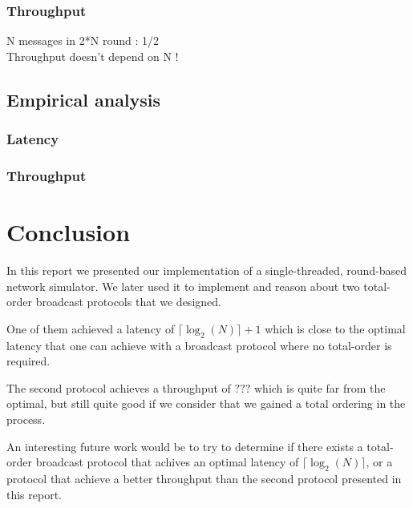 \documentclass[a4paper]{article}
\begin{document}
\subsubsection*{Throughput}
N messages in 2*N round : 1/2 \\
Throughput doesn't depend on N !
\subsection{Empirical analysis}

\subsubsection*{Latency}

\subsubsection*{Throughput}

\section*{Conclusion}
In this report we presented our implementation of a single-threaded,
round-based network simulator. We later used it to implement and reason about
two total-order broadcast protocols that we designed.

One of them achieved a latency of $\lceil\log_2(N)\rceil + 1$ which is close
to the optimal latency that one can achieve with a broadcast protocol where no
total-order is required.

The second protocol achieves a throughput of $???$ which is quite far from the
optimal, but still quite good if we consider that we gained a total ordering
in the process.

An interesting future work would be to try to determine if there exists a
total-order broadcast protocol that achives an optimal latency of
$\lceil\log_2(N)\rceil$, or a protocol that achieve a better throughput than
the second protocol presented in this report.
\end{document}
